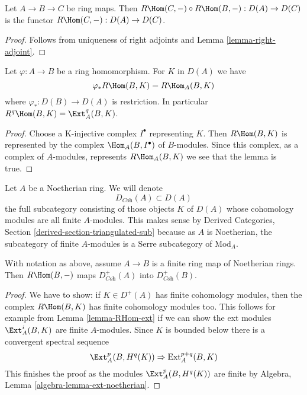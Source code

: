 \begin{lemma}
\label{lemma-composition-right-adjoints}
Let $A \to B \to C$ be ring maps. Then
$R\Hom(C, -) \circ R\Hom(B, -) : D(A) \to D(C)$
is the functor $R\Hom(C, -) : D(A) \to D(C)$.
\end{lemma}

\begin{proof}
Follows from uniqueness of right adjoints and Lemma \ref{lemma-right-adjoint}.
\end{proof}

\begin{lemma}
\label{lemma-RHom-ext}
Let $\varphi : A \to B$ be a ring homomorphism. For $K$ in $D(A)$ we have
$$
\varphi_*R\Hom(B, K) = R\Hom_A(B, K)
$$
where $\varphi_* : D(B) \to D(A)$ is restriction. In particular
$R^q\Hom(B, K) = \Ext_A^q(B, K)$.
\end{lemma}

\begin{proof}
Choose a K-injective complex $I^\bullet$ representing $K$.
Then $R\Hom(B, K)$ is represented by the complex $\Hom_A(B, I^\bullet)$
of $B$-modules. Since this complex, as a complex of $A$-modules,
represents $R\Hom_A(B, K)$ we see that the lemma is true.
\end{proof}

\noindent
Let $A$ be a Noetherian ring. We will denote
$$
D_{\textit{Coh}}(A) \subset D(A)
$$
the full subcategory consisting of those objects $K$ of $D(A)$
whose cohomology modules are all finite $A$-modules. This makes sense
by Derived Categories, Section \ref{derived-section-triangulated-sub}
because as $A$ is Noetherian, the subcategory of finite $A$-modules
is a Serre subcategory of $\text{Mod}_A$.

\begin{lemma}
\label{lemma-exact-support-coherent}
With notation as above, assume $A \to B$ is a finite ring map of
Noetherian rings. Then $R\Hom(B, -)$ maps
$D^+_{\textit{Coh}}(A)$ into $D^+_{\textit{Coh}}(B)$.
\end{lemma}

\begin{proof}
We have to show: if $K \in D^+(A)$ has finite cohomology modules, then the
complex $R\Hom(B, K)$ has finite cohomology modules too.
This follows for example from Lemma \ref{lemma-RHom-ext}
if we can show the ext modules $\Ext^i_A(B, K)$
are finite $A$-modules. Since $K$ is bounded below there is a
convergent spectral sequence
$$
\Ext^p_A(B, H^q(K)) \Rightarrow \text{Ext}^{p + q}_A(B, K)
$$
This finishes the proof as the modules $\Ext^p_A(B, H^q(K))$
are finite by
Algebra, Lemma \ref{algebra-lemma-ext-noetherian}.
\end{proof}

